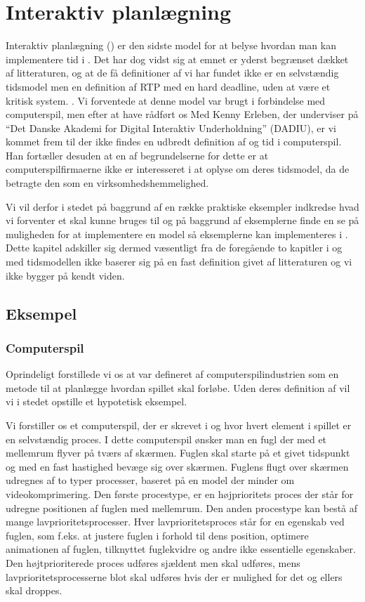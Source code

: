 \chapter{Interaktiv planlægning}
\label{chap:is}

Interaktiv planlægning (\is) er den sidste model for at belyse hvordan man kan implementere tid i \pycsp. Det har dog vidst sig at emnet er yderst begrænset dækket af litteraturen, og at de få definitioner af \is vi har fundet ikke er en selvstændig tidsmodel men en definition af RTP med en hard deadline, uden at være et kritisk system. \cite{?}. Vi forventede at denne model var brugt i forbindelse med computerspil, men efter at have rådført os Med Kenny Erleben, der underviser på  ``Det Danske Akademi for Digital Interaktiv Underholdning'' (DADIU), er vi kommet frem til der ikke findes en udbredt definition af \is og tid i computerspil. Han fortæller desuden at en af begrundelserne for dette  er at computerspilfirmaerne ikke er interesseret i at oplyse om deres tidsmodel, da de  betragte den som en  virksomhedshemmelighed. 

Vi vil derfor i stedet på baggrund af en række praktiske eksempler indkredse hvad vi forventer et \is skal kunne bruges til og på  baggrund af eksemplerne finde en se på muligheden for at implementere en model så eksemplerne kan implementeres i \pycsp. Dette kapitel adskiller sig dermed væsentligt fra de foregående to kapitler i og med tidsmodellen  ikke baserer sig på en fast definition givet af litteraturen og vi ikke bygger på kendt viden.

\section{Eksempel}

\subsection{Computerspil}
Oprindeligt forstillede vi os at \is var defineret af computerspilindustrien som en metode til at planlægge hvordan spillet skal forløbe. Uden deres definition af \is vil vi i stedet opstille et hypotetisk eksempel. 

Vi forstiller os et computerspil, der er skrevet i \pycsp og hvor hvert element i spillet er en selvstændig proces. I dette computerspil ønsker man en fugl der med et mellemrum flyver på tværs af skærmen. Fuglen skal starte på et givet tidspunkt og med en fast hastighed bevæge sig over skærmen. Fuglens flugt over skærmen udregnes af to typer processer, baseret på en model der minder om videokomprimering. Den første procestype, er en højprioritets proces der står for udregne positionen af fuglen med  mellemrum. Den anden procestype kan bestå af mange lavprioritetsprocesser. Hver lavprioritetsproces står for en egenskab ved fuglen, som  f.eks. at justere fuglen i forhold til dens position, optimere animationen af fuglen, tilknyttet fuglekvidre og andre ikke essentielle egenskaber.  Den højtprioriterede proces udføres sjældent men skal udføres, mens lavprioritetsprocesserne blot skal udføres hvis der er mulighed for det og ellers skal droppes.

